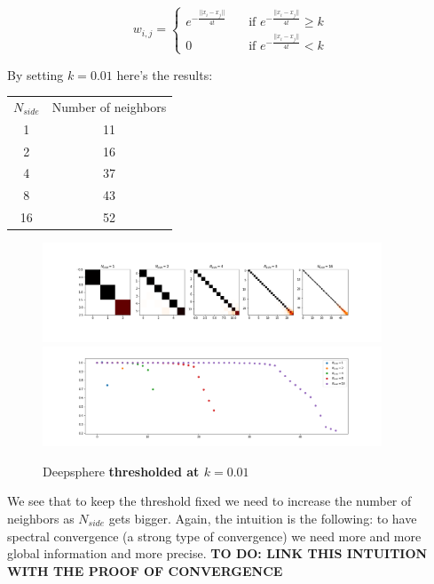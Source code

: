 $$w_{i,j} = \begin{cases}
e^{-\frac{||x_i-x_j||}{4t}}\quad& \text{if } e^{-\frac{||x_i-x_j||}{4t}} \geq k\\
0 \quad & \text{if } e^{-\frac{||x_i-x_j||}{4t}} < k
\end{cases}$$

By setting $k = 0.01$ here's the results:

\begin{center}
	\begin{tabular}{ c|c} 

		$N_{side}$ & Number of neighbors \\ 
	
		1 & 11 \\ 
		2 & 16 \\ 
		4 & 37 \\ 
		8 & 43 \\ 
		16 & 52 \\ 

\end{tabular}
\end{center}

\begin{figure}[h]
	\label{fig:DeepSphere_thresholded}
	\caption{Deepsphere \textbf{thresholded at $k=0.01$}}
	\centering
	\includegraphics[width=0.9\textwidth]{../codes/06_figures/deepsphere_thresholded.png}	
	\includegraphics[width=0.9\textwidth]{../codes/06_figures/deepsphere_thresholded_diagonal.png}	
\end{figure}

We see that to keep the threshold fixed we need to increase the number of neighbors as $N_{side}$ gets bigger. Again, the intuition is the following: to have spectral convergence (a strong type of convergence) we need more and more global information and more precise. 
\textbf{TO DO: LINK THIS INTUITION WITH THE PROOF OF CONVERGENCE}

\clearpage


